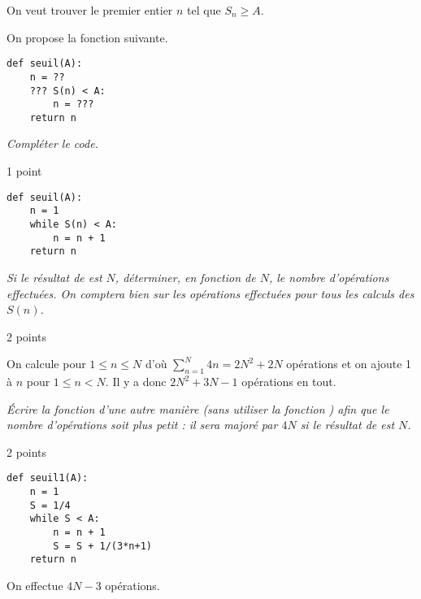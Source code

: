 On veut trouver le premier entier $n$ tel que $S_n \ge A$.

On propose la fonction suivante.
\begin{lstlisting}
def seuil(A):
    n = ??
    ??? S(n) < A:
        n = ???
    return n
\end{lstlisting}
\begin{Exercise}\it
Compléter le code.
\end{Exercise}
\begin{Answer}1 point
\begin{lstlisting}
def seuil(A):
    n = 1
    while S(n) < A:
        n = n + 1
    return n
\end{lstlisting}
\end{Answer}
\begin{Exercise}\it
Si le résultat de  est $N$, déterminer, en fonction de $N$, le nombre d'opérations effectuées. On comptera bien sur les opérations effectuées pour tous les calculs des $S(n)$.
\end{Exercise}
\begin{Answer}2 points
 
On calcule  pour $1\le n \le N$ d'où $\displaystyle \sum_{n=1}^N 4n = 2N^2 + 2N$ opérations et on ajoute 1 à $n$ pour $1\le n< N$. Il y a donc $2N^2+3N-1$ opérations en tout.
\end{Answer}
\begin{Exercise}\it
Écrire la fonction  d'une autre manière (sans utiliser la fonction ) afin que le nombre d'opérations soit plus petit : il sera majoré par $4N$ si le résultat de  est $N$.
\end{Exercise}
\begin{Answer}2 points
\begin{lstlisting}
def seuil1(A):
    n = 1
    S = 1/4
    while S < A:
        n = n + 1
        S = S + 1/(3*n+1)
    return n
\end{lstlisting}
On effectue $4N-3$ opérations.
\end{Answer}
\medskip

